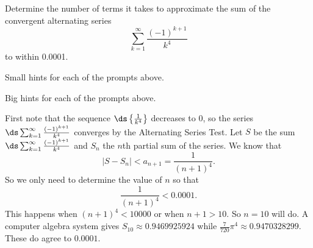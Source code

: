 \begin{activity} \label{8.4.Act3}  Determine the number of terms it takes to approximate the sum of the convergent alternating series
\[\sum_{k=1}^{\infty} \frac{(-1)^{k+1}}{k^4}\]
 to within 0.0001. %
\end{activity}

\begin{smallhint}
\ba
	\item Small hints for each of the prompts above.
\ea
\end{smallhint}
\begin{bighint}
\ba
	\item Big hints for each of the prompts above.
\ea
\end{bighint}
\begin{activitySolution}
	First note that the sequence $\ds \left\{\frac{1}{k^4}\right\}$ decreases to 0, so the series $\ds \sum_{k=1}^{\infty} \frac{(-1)^{k+1}}{k^4}$ converges by the Alternating Series Test. Let $S$ be the sum $\ds \sum_{k=1}^{\infty} \frac{(-1)^{k+1}}{k^4}$ and $S_n$ the $n$th partial sum of the series. We know that 
\[|S - S_n| < a_{n+1} = \frac{1}{(n+1)^4}.\]
So we only need to determine the value of $n$ so that 
\[\frac{1}{(n+1)^4} < 0.0001.\]
This happens when $(n+1)^4 < 10000$ or when $n+1 > 10$. So $n = 10$ will do. A computer algebra system gives $S_{10} \approx 0.9469925924$ while $\frac{7}{720} \pi^4 \approx 0.9470328299$. These do agree to $0.0001$. 
\end{activitySolution}
\aftera 